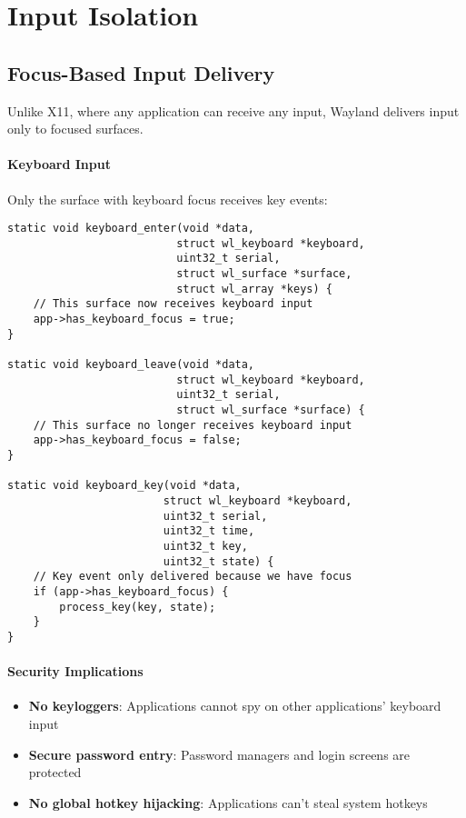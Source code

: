 \section{Input Isolation}

\subsection{Focus-Based Input Delivery}

Unlike X11, where any application can receive any input, Wayland delivers input only to focused surfaces.

\paragraph{Keyboard Input}
Only the surface with keyboard focus receives key events:

\begin{lstlisting}[style=cstyle, caption=Keyboard Focus Events]
static void keyboard_enter(void *data,
                          struct wl_keyboard *keyboard,
                          uint32_t serial,
                          struct wl_surface *surface,
                          struct wl_array *keys) {
    // This surface now receives keyboard input
    app->has_keyboard_focus = true;
}

static void keyboard_leave(void *data,
                          struct wl_keyboard *keyboard,
                          uint32_t serial,
                          struct wl_surface *surface) {
    // This surface no longer receives keyboard input
    app->has_keyboard_focus = false;
}

static void keyboard_key(void *data,
                        struct wl_keyboard *keyboard,
                        uint32_t serial,
                        uint32_t time,
                        uint32_t key,
                        uint32_t state) {
    // Key event only delivered because we have focus
    if (app->has_keyboard_focus) {
        process_key(key, state);
    }
}
\end{lstlisting}

\paragraph{Security Implications}

\begin{itemize}
    \item \textbf{No keyloggers}: Applications cannot spy on other applications' keyboard input
    \item \textbf{Secure password entry}: Password managers and login screens are protected
    \item \textbf{No global hotkey hijacking}: Applications can't steal system hotkeys
\end{itemize}

